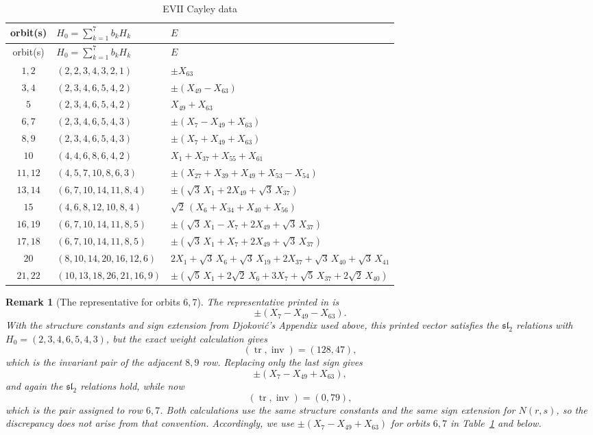 \documentclass[10pt,a4paper]{amsart}
\numberwithin{equation}{section}
\newtheorem{remark}[theorem]{Remark}
\begin{document}
\begingroup
\small
\renewcommand{\arraystretch}{1.08}
\begin{longtable}{@{}c >{\raggedright\arraybackslash}p{}
 >{\raggedright\arraybackslash}p{}@{}}
\caption{EVII Cayley data}\label{evii:tab:cayley-data}\\
\toprule
orbit(s)&$H_0=\sum_{k=1}^7b_kH_k$&$E$\\
\midrule
\endfirsthead
\toprule
orbit(s)&$H_0=\sum_{k=1}^7b_kH_k$&$E$\\
\midrule
\endhead
$1,2$ & $(2,2,3,4,3,2,1)$ & $\pm X_{63}$\\
$3,4$ & $(2,3,4,6,5,4,2)$ & $\pm(X_{49}-X_{63})$\\
$5$ & $(2,3,4,6,5,4,2)$ & $X_{49}+X_{63}$\\
$6,7$ & $(2,3,4,6,5,4,3)$ & $\pm(X_7-X_{49}+X_{63})$\\
$8,9$ & $(2,3,4,6,5,4,3)$ & $\pm(X_7+X_{49}+X_{63})$\\
$10$ & $(4,4,6,8,6,4,2)$ & $X_1+X_{37}+X_{55}+X_{61}$\\
$11,12$ & $(4,5,7,10,8,6,3)$ &
 $\pm(X_{27}+X_{39}+X_{49}+X_{53}-X_{54})$\\
$13,14$ & $(6,7,10,14,11,8,4)$ &
 $\pm(\sqrt3\,X_1+2X_{49}+\sqrt3\,X_{37})$\\
$15$ & $(4,6,8,12,10,8,4)$ &
 $\sqrt2\,(X_6+X_{34}+X_{40}+X_{56})$\\
$16,19$ & $(6,7,10,14,11,8,5)$ &
 $\pm(\sqrt3\,X_1-X_7+2X_{49}+\sqrt3\,X_{37})$\\
$17,18$ & $(6,7,10,14,11,8,5)$ &
 $\pm(\sqrt3\,X_1+X_7+2X_{49}+\sqrt3\,X_{37})$\\
$20$ & $(8,10,14,20,16,12,6)$ &
 $2X_1+\sqrt3\,X_6+\sqrt3\,X_{19}+2X_{37}+\sqrt3\,X_{40}+\sqrt3\,X_{41}$\\
$21,22$ & $(10,13,18,26,21,16,9)$ &
 $\pm(\sqrt5\,X_1+2\sqrt2\,X_6+3X_7+\sqrt5\,X_{37}+2\sqrt2\,X_{40})$\\
\bottomrule
\end{longtable}
\endgroup

\begin{remark}[The representative for orbits $6,7$]
\label{evii:rem:djokovic-sign}
The representative printed in \cite[Table~6]{Djokovic} is
\[
  \pm(X_7-X_{49}-X_{63}).
\]
With the structure constants and sign extension from Djokovi\'c's Appendix
used above, this printed vector satisfies the $\mathfrak{sl}_2$ relations
with $H_0=(2,3,4,6,5,4,3)$, but the exact weight calculation gives
\[
  (\operatorname{tr},\operatorname{inv})=(128,47),
\]
which is the invariant pair of the adjacent $8,9$ row.  Replacing only the
last sign gives
\[
  \pm(X_7-X_{49}+X_{63}),
\]
and again the $\mathfrak{sl}_2$ relations hold, while now
\[
  (\operatorname{tr},\operatorname{inv})=(0,79),
\]
which is the pair assigned to row $6,7$.  Both calculations use the same
structure constants and the same sign extension for $N(r,s)$, so the
discrepancy does not arise from that convention.
Accordingly, we use $\pm(X_7-X_{49}+X_{63})$ for orbits $6,7$ in
Table~\ref{evii:tab:cayley-data} and below.
\end{remark}
\end{document}

